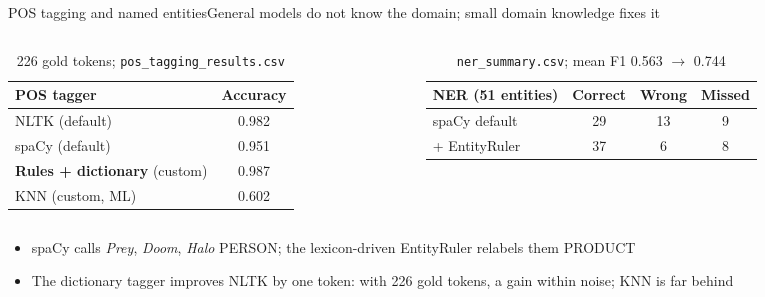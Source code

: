 \documentclass[
  aspectratio=169,
  10pt,
  t,
]{beamer}
\begin{document}
\begin{frame}{POS tagging and named entities}{General models do not know the domain; small domain knowledge fixes it}
\begin{columns}[T]
\begin{column}{.47\textwidth}
\begin{table}
\footnotesize
\begin{tabular}{lc}
\toprule
POS tagger & Accuracy \\
\midrule
NLTK (default) & 0.982 \\
spaCy (default) & 0.951 \\
\textbf{Rules + dictionary} (custom) & \alert{0.987} \\
KNN (custom, ML) & 0.602 \\
\bottomrule
\end{tabular}
\caption{226 gold tokens; \texttt{pos\_tagging\_results.csv}}
\end{table}
\end{column}
\begin{column}{.5\textwidth}
\begin{table}
\footnotesize
\begin{tabular}{lccc}
\toprule
NER (51 entities) & Correct & Wrong & Missed \\
\midrule
spaCy default & 29 & 13 & 9 \\
+ EntityRuler & \alert{37} & 6 & 8 \\
\bottomrule
\end{tabular}
\caption{\texttt{ner\_summary.csv}; mean F1 0.563 $\rightarrow$ 0.744}
\end{table}
\end{column}
\end{columns}
\begin{itemize}
  \item spaCy calls \emph{Prey}, \emph{Doom}, \emph{Halo} \alert{PERSON}; the lexicon-driven EntityRuler relabels them PRODUCT
  \item The dictionary tagger improves NLTK by one token: with 226 gold tokens, a gain within noise; KNN is far behind
\end{itemize}
\end{frame}
\end{document}
